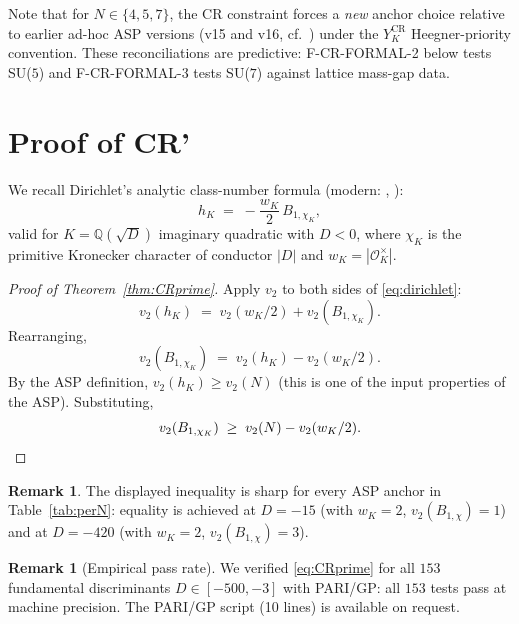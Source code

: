 \documentclass[11pt,a4paper,reqno]{amsart}
\theoremstyle{definition}
\newtheorem{remark}[theorem]{Remark}
\newcommand{\OK}{\mathcal{O}_K}
\newcommand{\YKCR}{Y_K^{\mathrm{CR}}}
\newcommand{\QQ}{\mathbb{Q}}
\newcommand{\vtwo}{v_2}
\begin{document}
Note that for $N\in\{4,5,7\}$, the CR constraint forces a \emph{new} anchor
choice relative to earlier ad-hoc ASP versions (v15 and v16, cf.\
\cite{Remondiere2026Survey}) under the $\YKCR$ Heegner-priority convention.
These reconciliations are predictive: F-CR-FORMAL-2 below tests
SU($5$) and F-CR-FORMAL-3 tests SU($7$) against lattice mass-gap data.

\section{Proof of CR'}\label{sec:CRprime-proof}

We recall Dirichlet's analytic class-number formula \cite{Dirichlet1839}
(modern: \cite[Thm.~4.9.5]{Davenport2000}, \cite[\S7.B]{Cox1989}):
\begin{equation}\label{eq:dirichlet}
   h_K \;=\; -\frac{w_K}{2}\,B_{1,\chi_K},
\end{equation}
valid for $K=\QQ(\sqrt{D})$ imaginary quadratic with $D<0$, where $\chi_K$ is
the primitive Kronecker character of conductor $|D|$ and $w_K = |\OK^\times|$.

\begin{proof}[Proof of Theorem~\ref{thm:CRprime}]
Apply $\vtwo$ to both sides of \eqref{eq:dirichlet}:
\[
  \vtwo(h_K) \;=\; \vtwo(w_K/2) + \vtwo(B_{1,\chi_K}).
\]
Rearranging,
\[
  \vtwo(B_{1,\chi_K}) \;=\; \vtwo(h_K) - \vtwo(w_K/2).
\]
By the ASP definition, $\vtwo(h_K) \ge \vtwo(N)$ (this is one of the input
properties of the ASP). Substituting,
\[
  \vtwo(B_{1,\chi_K}) \;\ge\; \vtwo(N) - \vtwo(w_K/2). \qedhere
\]
\end{proof}

\begin{remark}
The displayed inequality is sharp for every ASP anchor in Table~\ref{tab:perN}: equality is achieved at $D=-15$ (with $w_K=2$, $\vtwo(B_{1,\chi})=1$) and at $D=-420$ (with $w_K=2$, $\vtwo(B_{1,\chi})=3$).
\end{remark}

\begin{remark}[Empirical pass rate]
We verified \eqref{eq:CRprime} for all $153$ fundamental discriminants
$D\in[-500,-3]$ with PARI/GP: all $153$ tests pass at machine precision.
The PARI/GP script (10 lines) is available on request.
\end{remark}

\end{document}

